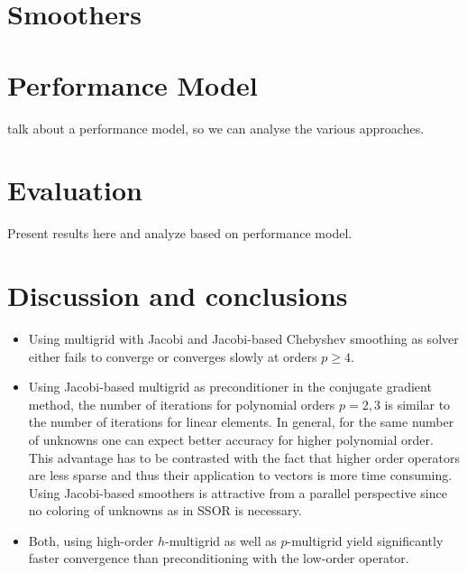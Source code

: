 \documentclass[times]{nlaauth}
\begin{document}
\section{Smoothers}



\section{Performance Model}

talk about a performance model, so we can analyse the various approaches.

\section{Evaluation}

Present results here and analyze based on performance model.



\section{Discussion and conclusions}


\begin{itemize}
\item Using multigrid with Jacobi and Jacobi-based Chebyshev smoothing
  as solver either fails to converge or converges slowly at orders
  $p\ge 4$.
\item Using Jacobi-based multigrid as preconditioner in the conjugate
  gradient method, the number of iterations for polynomial orders
  $p=2,3$ is similar to the number of iterations for linear elements.
  In general, for the same number of unknowns one can expect better
  accuracy for higher polynomial order. This advantage has to be
  contrasted with the fact that higher order operators are less sparse
  and thus their application to vectors is more time consuming.  Using
  Jacobi-based smoothers is attractive from a parallel perspective
  since no coloring of unknowns as in SSOR is necessary.
\item Both, using high-order $h$-multigrid as well as $p$-multigrid
  yield significantly faster convergence than preconditioning with the
  low-order operator.

\end{itemize}




\end{document}
